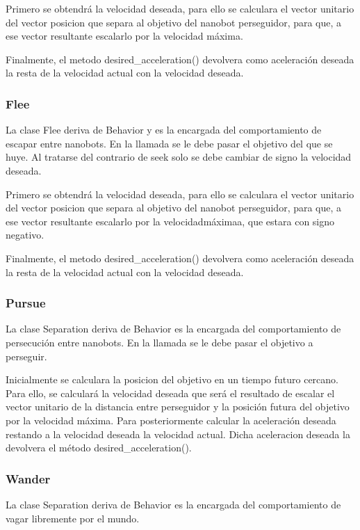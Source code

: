 Primero se obtendrá la velocidad deseada, para ello se calculara el vector unitario del vector posicion que separa al objetivo del nanobot perseguidor, para que, a ese vector resultante escalarlo por la  velocidad máxima.

Finalmente, el metodo desired\_acceleration() devolvera como aceleración deseada la resta de la velocidad actual con la velocidad deseada.

\subsubsection{Flee}
\label{sec:flee}
La clase Flee deriva de Behavior y es la encargada del comportamiento de escapar entre nanobots. En la llamada se le debe pasar el objetivo del que se huye. Al tratarse del contrario de seek solo se debe cambiar de signo la velocidad deseada.

Primero se obtendrá la velocidad deseada, para ello se calculara el vector unitario del vector posicion que separa al objetivo del nanobot perseguidor, para que, a ese vector resultante escalarlo por la  velocidadmáximaa, que estara con signo negativo.

Finalmente, el metodo desired\_acceleration() devolvera como aceleración deseada la resta de la velocidad actual con la velocidad deseada.

\subsubsection{Pursue}
\label{sec:pursue}
La clase Separation deriva de Behavior es la encargada del comportamiento de persecución entre nanobots.  En la llamada se le debe pasar el objetivo a perseguir.

Inicialmente se calculara la posicion del objetivo en un tiempo futuro cercano. Para ello, se calculará la velocidad deseada que será el resultado de escalar el vector unitario de la distancia entre perseguidor y la posición futura del objetivo por la velocidad máxima. Para posteriormente calcular la aceleración deseada restando a la velocidad deseada la velocidad actual. Dicha aceleracion deseada la devolvera el método desired\_acceleration().



\subsubsection{Wander}
\label{sec:wander}
La clase Separation deriva de Behavior es la encargada del comportamiento de vagar libremente por el mundo.

